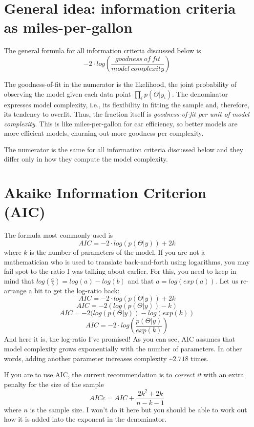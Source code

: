 \documentclass[
]{book}
\begin{document}
\hypertarget{general-idea-information-criteria-as-miles-per-gallon}{%
\section{General idea: information criteria as miles-per-gallon}\label{general-idea-information-criteria-as-miles-per-gallon}}

The general formula for all information criteria discussed below is
\[-2\cdot log \left( \frac{goodness~of~fit}{model~complexity} \right)\]

The goodness-of-fit in the numerator is the likelihood, the joint probability of observing the model given each data point \(\prod_i p(\Theta|y_i)\). The denominator expresses model complexity, i.e., its flexibility in fitting the sample and, therefore, its tendency to overfit. Thus, the fraction itself is \emph{goodness-of-fit per unit of model complexity}. This is like miles-per-gallon for car efficiency, so better models are more efficient models, churning out more goodness per complexity.

The numerator is the same for all information criteria discussed below and they differ only in how they compute the model complexity.

\hypertarget{akaike-information-criterion-aic}{%
\section{Akaike Information Criterion (AIC)}\label{akaike-information-criterion-aic}}

The formula most commonly used is
\[ AIC = -2\cdot log(p(\Theta|y)) + 2k \]
where \(k\) is the number of parameters of the model. If you are not a mathematician who is used to translate back-and-forth using logarithms, you may fail spot to the ratio I was talking about earlier. For this, you need to keep in mind that \(log(\frac{a}{b}) = log(a) - log(b)\) and that \(a = log(exp(a))\). Let us re-arrange a bit to get the log-ratio back:
\[ AIC = -2\cdot log(p(\Theta|y)) + 2k \]
\[ AIC = -2 (log(p(\Theta|y)) - k)\]
\[ AIC = -2 (log(p(\Theta|y)) - log(exp(k))\]
\[ AIC = -2 \cdot log \left(\frac{p(\Theta|y)}{exp(k)} \right)\]
And here it is, the log-ratio I've promised! As you can see, AIC assumes that model complexity grows exponentially with the number of parameters. In other words, adding another parameter increases complexity \textasciitilde{}\(2.718\) times.

If you are to use AIC, the current recommendation is to \emph{correct it} with an extra penalty for the size of the sample
\[AICc = AIC + \frac{2k^2 + 2k}{n - k - 1}\]
where \(n\) is the sample size. I won't do it here but you should be able to work out how it is added into the exponent in the denominator.
\end{document}
